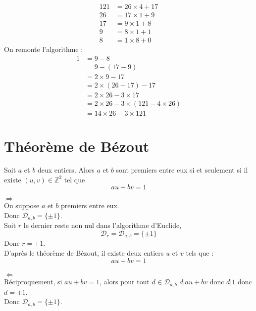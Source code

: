 \documentclass[../main.tex]{subfiles}
\begin{document}
\begin{align*}
    121 &= 26 \times 4 + 17 \\
    26 &= 17 \times 1 + 9 \\
    17 &= 9 \times 1 + 8 \\
    9 &= 8 \times 1 + 1 \\
    8 &= 1 \times 8 + 0
\end{align*}
On remonte l'algorithme : 
\begin{align*}
    1 &= 9 - 8 \\
    &= 9 - (17 - 9) \\
    &= 2 \times 9 - 17 \\
    &= 2 \times (26 - 17) - 17 \\
    &= 2 \times 26 - 3 \times 17 \\
    &= 2 \times 26 - 3 \times (121 - 4 \times 26) \\
    &= 14 \times 26 - 3 \times 121
\end{align*}

\setcounter{section}{25}
\section{Théorème de Bézout}
\begin{tcolorbox}[title=Théorème 12.26, title filled=false, colframe=orange, colback=orange!10!white]
    Soit $a$ et $b$ deux entiers. Alors $a$ et $b$ sont premiers entre eux si et seulement si il existe $(u,v) \in \mathbb{Z}^2$ tel que
    $$au + bv = 1$$
\end{tcolorbox}

$\boxed{\Rightarrow}$ \\
On suppose $a$ et $b$ premiers entre eux. \\
Donc $\mathcal{D}_{a,b} = \{\pm 1\}$. \\
Soit $r$ le dernier reste non nul dans l'algorithme d'Euclide, \\
$$\mathcal{D}_r = \mathcal{D}_{a,b} = \{\pm 1\}$$
Donc $r = \pm 1$. \\
D'après le théorème de Bézout, il existe deux entiers $u$ et $v$ tels que : 
$$au + bv = 1$$ \\

$\boxed{\Leftarrow}$ \\
Réciproquement, si $au + bv = 1$, alors pour tout $d \in \mathcal{D}_{a,b}$ $d|au + bv$ donc $d|1$ donc $d = \pm 1$. \\
Donc $\mathcal{D}_{a,b} = \{\pm 1\}$. 

\setcounter{section}{27}
\end{document}
